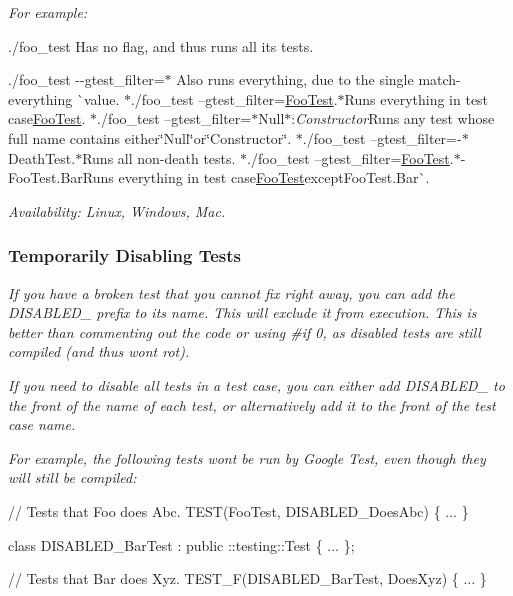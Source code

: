 {\itshape For example\+:}

{\itshape 
\begin{DoxyItemize}
\item {\ttfamily ./foo\+\_\+test} Has no flag, and thus runs all its tests.
\item {\ttfamily ./foo\+\_\+test -\/-\/gtest\+\_\+filter=$\ast$} Also runs everything, due to the single match-\/everything \`{}{\ttfamily value. $\ast$}./foo\+\_\+test --gtest\+\_\+filter=\mbox{\hyperlink{class_foo_test}{Foo\+Test}}.$\ast${\ttfamily Runs everything in test case}\mbox{\hyperlink{class_foo_test}{Foo\+Test}}{\ttfamily . $\ast$}./foo\+\_\+test --gtest\+\_\+filter=$\ast$\+Null$\ast$\+:{\itshape Constructor}{\ttfamily Runs any test whose full name contains either}\char`\"{}\+Null\char`\"{}{\ttfamily or}\char`\"{}\+Constructor\char`\"{}{\ttfamily . $\ast$}./foo\+\_\+test --gtest\+\_\+filter=-\/$\ast$\+Death\+Test.$\ast${\ttfamily Runs all non-\/death tests. $\ast$}./foo\+\_\+test --gtest\+\_\+filter=\mbox{\hyperlink{class_foo_test}{Foo\+Test}}.$\ast$-\/\+Foo\+Test.Bar{\ttfamily Runs everything in test case}\mbox{\hyperlink{class_foo_test}{Foo\+Test}}{\ttfamily except}Foo\+Test.\+Bar\`{}.
\end{DoxyItemize}}

{\itshape {\itshape Availability\+:} Linux, Windows, Mac.}

{\itshape \subsubsection*{Temporarily Disabling Tests}}

{\itshape }

{\itshape If you have a broken test that you cannot fix right away, you can add the {\ttfamily D\+I\+S\+A\+B\+L\+E\+D\+\_\+} prefix to its name. This will exclude it from execution. This is better than commenting out the code or using {\ttfamily \#if 0}, as disabled tests are still compiled (and thus won\textquotesingle{}t rot).}

{\itshape If you need to disable all tests in a test case, you can either add {\ttfamily D\+I\+S\+A\+B\+L\+E\+D\+\_\+} to the front of the name of each test, or alternatively add it to the front of the test case name.}

{\itshape For example, the following tests won\textquotesingle{}t be run by Google Test, even though they will still be compiled\+:}

{\itshape 
\begin{DoxyCode}
// Tests that Foo does Abc.
TEST(FooTest, DISABLED\_DoesAbc) \{ ... \}

class DISABLED\_BarTest : public ::testing::Test \{ ... \};

// Tests that Bar does Xyz.
TEST\_F(DISABLED\_BarTest, DoesXyz) \{ ... \}
\end{DoxyCode}
}

